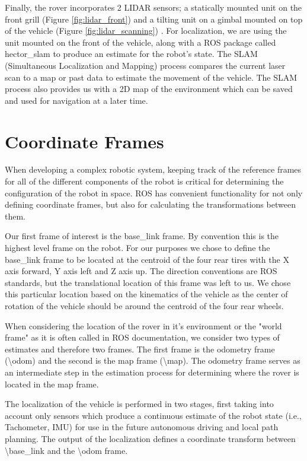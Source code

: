 Finally, the rover incorporates 2 LIDAR sensors; a statically mounted unit on the front grill (Figure \ref{fig:lidar_front}) and a tilting unit on a gimbal mounted on top of the vehicle (Figure \ref{fig:lidar_scanning}) . For localization, we are using the unit mounted on the front of the vehicle, along with a ROS package called hector\_slam to produce an estimate for the robot's state. The SLAM (Simultaneous Localization and Mapping) process compares the current laser scan to a map or past data to estimate the movement of the vehicle. The SLAM process also provides us with a 2D map of the environment which can be saved and used for navigation at a later time.

\section{Coordinate Frames}


When developing a complex robotic system, keeping track of the reference frames for all of the different components of the robot is critical for determining the configuration of the robot in space. ROS has convenient functionality for not only defining coordinate frames, but also for calculating the transformations between them. 

Our first frame of interest is the base\_link frame. By convention this is the highest level frame on the robot. For our purposes we chose to define the base\_link frame to be located at the centroid of the four rear tires with the X axis forward, Y axis left and Z axis up. The direction conventions are ROS standards, but the translational location of this frame was left to us. We chose this particular location based on the kinematics of the vehicle as the center of rotation of the vehicle should be around the centroid of the four rear wheels. 

When considering the location of the rover in it's environment or the "world frame" as it is often called in ROS documentation, we consider two types of estimates and therefore two frames. The first frame is the odometry frame (\textbackslash odom) and the second is the map frame (\textbackslash map). The odometry frame serves as an intermediate step in the estimation process for determining where the rover is located in the map frame.

The localization of the vehicle is performed in two stages, first taking into account only sensors which produce a continuous estimate of the robot state (i.e., Tachometer, IMU) for use in the future autonomous driving and local path planning. The output of the localization defines a coordinate transform between \textbackslash base\_link and the \textbackslash odom frame.

